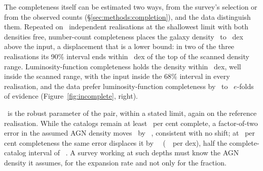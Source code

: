 The completeness itself can be estimated two ways, from the survey's
selection or from the observed counts (\S\ref{sec:methods:completion}), and
the data distinguish them. Repeated on \NSeedsIncomplete\ independent
realisations at the shallowest limit with both densities free,
number-count completeness places the galaxy density \PixelAnchorBiasMinDex\
to \PixelAnchorBiasMaxDex~dex above the input, a displacement that is a
lower bound: in two of the three realisations its 90\% interval ends within
\PixelAnchorEdgeGapMaxDex~dex of the top of the scanned density range.
Luminosity-function completeness holds the density within
\GalAnchorOffsetMaxDex~dex, well inside the scanned range, with the input
inside the 68\% interval in every realisation, and the data prefer
luminosity-function completeness by \SeedLnBFmin\ to \SeedLnBFmax\
$e$-folds of evidence (Figure~\ref{fig:incomplete}, right).

\Hz\ is the robust parameter of the pair, within a stated limit, again on
the reference realisation. While the
catalogs remain at least \CompMTwenty\ per cent complete, a factor-of-two
error in the assumed AGN density moves \Hz\ by
\HzDensityShiftFactorTwoDeep~\kmsmpc, consistent with no shift; at
\CompMEighteen\ per cent
completeness the same error displaces it by
\HzDensityShiftFactorTwo~\kmsmpc\ (\HzDensitySlopeShallow~\kmsmpc\ per
dex), half the complete-catalog interval of \HzeroJointWidth~\kmsmpc. A survey working at such depths must know the AGN
density it assumes, for the expansion rate and not only for the fraction.
